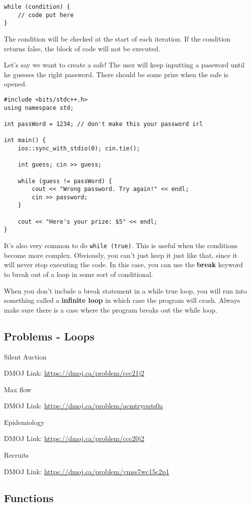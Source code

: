 \documentclass{report}
\newcommand{\problem}[2]{
    \begin{problembox}
        #1
        
        DMOJ Link: \href{#2}{#2}
    \end{problembox}
}
\begin{document}
\begin{lstlisting}[caption=While loop syntax]
while (condition) {
    // code put here
}
\end{lstlisting}

The condition will be checked at the start of each iteration. If the condition returns false, the block of code will not be executed.

Let's say we want to create a safe! The user will keep inputting a password until he guesses the right password. There should be some prize when the safe is opened.

\begin{lstlisting}
#include <bits/stdc++.h>
using namespace std;

int passWord = 1234; // don't make this your password irl

int main() {
    ios::sync_with_stdio(0); cin.tie();

    int guess; cin >> guess;

    while (guess != passWord) {
        cout << "Wrong password. Try again!" << endl;
        cin >> password;
    }

    cout << "Here's your prize: $5" << endl; 
}
\end{lstlisting}

It's also very common to do \lstinline{while (true)}. This is useful when the conditions become more complex. Obviously, you can't just keep it just like that, since it will never stop executing the code. In this case, you can use the \textbf{break} keyword to break out of a loop in some sort of conditional.

\begin{principle}
    When you don't include a break statement in a while true loop, you will run into something called a \textbf{infinite loop} in which case the program will crash. Always make sure there is a case where the program breaks out the while loop.
\end{principle}

\subsection{Problems - Loops}
\problem{Silent Auction}{https://dmoj.ca/problem/ccc21j2}
\problem{Max flow}{https://dmoj.ca/problem/acmtryouts0a}
\problem{Epidemiology}{https://dmoj.ca/problem/ccc20j2}
\problem{Recruits}{https://dmoj.ca/problem/vmss7wc15c2p1}

\subsection{Functions}
\end{document}
